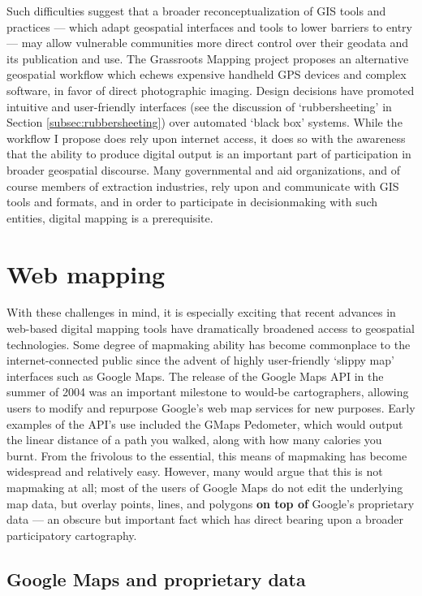 \documentclass[11pt,oneside,notitlepage]{report}
\begin{document}
Such difficulties suggest that a broader reconceptualization of GIS tools and practices --- which adapt geospatial interfaces and tools to lower barriers to entry --- may allow vulnerable communities more direct control over their geodata and its publication and use. The Grassroots Mapping project proposes an alternative geospatial workflow which echews expensive handheld GPS devices and complex software, in favor of direct photographic imaging. Design decisions have promoted intuitive and user-friendly interfaces (see the discussion of `rubbersheeting' in Section \ref{subsec:rubbersheeting}) over automated `black box' systems. While the workflow I propose does rely upon internet access, it does so with the awareness that the ability to produce digital output is an important part of participation in broader geospatial discourse. Many governmental and aid organizations, and of course members of extraction industries, rely upon and communicate with GIS tools and formats, and in order to participate in decisionmaking with such entities, digital mapping is a prerequisite. 

\section{Web mapping}
\label{sec:webmapping}

With these challenges in mind, it is especially exciting that recent advances in web-based digital mapping tools have dramatically broadened access to geospatial technologies. Some degree of mapmaking ability has become commonplace to the internet-connected public since the advent of highly user-friendly `slippy map' interfaces such as Google Maps. The release of the Google Maps \ac{API} in the summer of 2004 was an important milestone to would-be cartographers, allowing users to modify and repurpose Google's web map services for new purposes. Early examples of the API's use included the GMaps Pedometer, which would output the linear distance of a path you walked, along with how many calories you burnt. \cite{gibson2006google} From the frivolous to the essential, this means of mapmaking has become widespread and relatively easy. However, many would argue that this is not mapmaking at all; most of the users of Google Maps do not edit the underlying map data, but overlay points, lines, and polygons \textbf{on top of} Google's proprietary data --- an obscure but important fact which has direct bearing upon a broader participatory cartography. 

\subsection{Google Maps and proprietary data}
\end{document}
